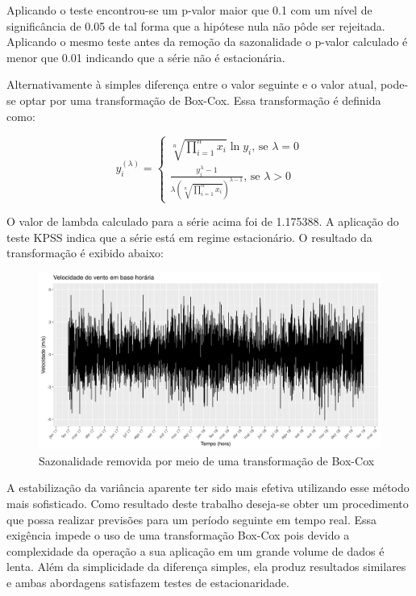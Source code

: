 \documentclass[
	12pt,				%
	openright,			%
	oneside,			%
	a4paper,			%
	english,			%
	french,				%
	spanish,			%
	brazil				%
	]{abntex2}
\begin{document}
Aplicando o teste encontrou-se um p-valor maior que 0.1 com um nível de significância de 0.05 de tal forma que a hipótese nula não pôde ser rejeitada. Aplicando o mesmo teste antes da remoção da sazonalidade o p-valor calculado é menor que 0.01 indicando que a série não é estacionária. 

Alternativamente à simples diferença entre o valor seguinte e o valor atual, pode-se optar por uma transformação de Box-Cox. Essa transformação é definida como:

\begin{equation}
y_i^{(\lambda)} = 
	\begin{cases}
		\sqrt[n]{\prod\limits_{i=1}^{n}x_i}\ln y_i\text{, se $\lambda = 0$}
		\\
		\frac{y_i^\lambda-1}{\lambda\left(\sqrt[n]{\prod\limits_{i=1}^{n}x_i}\right)^{\lambda-1}} \text{, se $\lambda > 0$}
	\end{cases}	
\end{equation}
 
O valor de lambda calculado para a série acima foi de 1.175388. A aplicação do teste KPSS indica que a série está em regime estacionário. O resultado da transformação é exibido abaixo:

\begin{figure}[h]
    \centering
	\includegraphics[width=\textwidth]{entire_series_hourly_basis_seasonless_boxcox.png}
	\caption{Sazonalidade removida por meio de uma transformação de Box-Cox}
\end{figure}
\FloatBarrier 

A estabilização da variância aparente ter sido mais efetiva utilizando esse método mais sofisticado. Como resultado deste trabalho deseja-se obter um procedimento que possa realizar previsões para um período seguinte em tempo real. Essa exigência impede o uso de uma transformação Box-Cox pois devido a complexidade da operação a sua aplicação em um grande volume de dados é lenta. Além da simplicidade da diferença simples, ela produz resultados similares e ambas abordagens satisfazem testes de estacionaridade.
\end{document}
